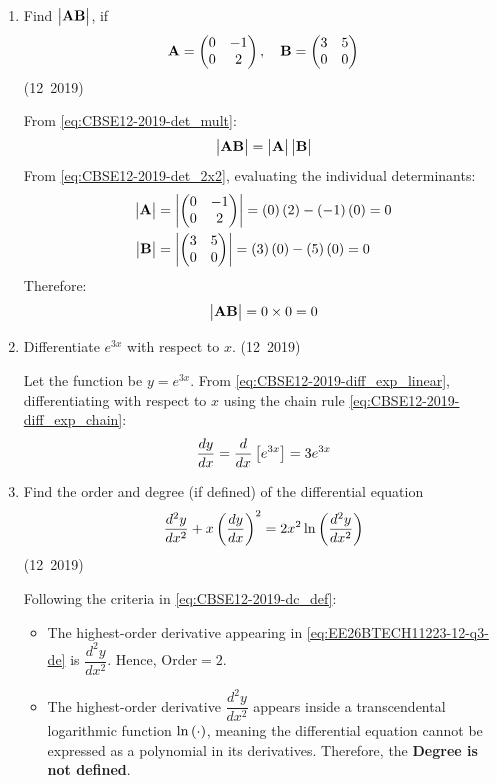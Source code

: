 \begin{enumerate}[label=\thesubsection.\arabic*, ref=\thesubsection.\theenumi]
	
\item Find $\begin{vmatrix}\mathbf{AB}\end{vmatrix}$, if
\begin{align}
	\mathbf{A} = \begin{pmatrix}0 & -1 \\ 0 & 2\end{pmatrix}, \quad \mathbf{B} = \begin{pmatrix}3 & 5 \\ 0 & 0\end{pmatrix}
\end{align}
\hfill (12~2019)

\solution
From \eqref{eq:CBSE12-2019-det_mult}:
\begin{align}
	\begin{vmatrix}\mathbf{AB}\end{vmatrix} = \begin{vmatrix}\mathbf{A}\end{vmatrix} \begin{vmatrix}\mathbf{B}\end{vmatrix}
\end{align}
From \eqref{eq:CBSE12-2019-det_2x2}, evaluating the individual determinants:
\begin{align}
	\begin{vmatrix}\mathbf{A}\end{vmatrix} &= \begin{vmatrix}\begin{pmatrix}0 & -1 \\ 0 & 2\end{pmatrix}\end{vmatrix} = \left(0\right)\left(2\right) - \left(-1\right)\left(0\right) = 0 \\
	\begin{vmatrix}\mathbf{B}\end{vmatrix} &= \begin{vmatrix}\begin{pmatrix}3 & 5 \\ 0 & 0\end{pmatrix}\end{vmatrix} = \left(3\right)\left(0\right) - \left(5\right)\left(0\right) = 0
\end{align}
Therefore:
\begin{align}
	\begin{vmatrix}\mathbf{AB}\end{vmatrix} = 0 \times 0 = 0
\end{align}


\item Differentiate $e^{3x}$ with respect to $x$.
\hfill (12~2019)

\solution
Let the function be $y = e^{3x}$.
From \eqref{eq:CBSE12-2019-diff_exp_linear}, differentiating with respect to $x$ using the chain rule \eqref{eq:CBSE12-2019-diff_exp_chain}:
\begin{align}
	\frac{dy}{dx} = \frac{d}{dx}{}\left[e^{3x}\right] = 3e^{3x}
\end{align}


\item Find the order and degree (if defined) of the differential equation
\begin{align}
	\frac{d^2y}{dx^2} + x\left(\frac{dy}{dx}\right)^2 = 2x^2\ln\left(\frac{d^2y}{dx^2}\right) \label{eq:EE26BTECH11223-12-q3-de}
\end{align}
\hfill (12~2019)

\solution
Following the criteria in \eqref{eq:CBSE12-2019-dc_def}:
\begin{itemize}
	\item The highest-order derivative appearing in \eqref{eq:EE26BTECH11223-12-q3-de} is $\dfrac{d^2y}{dx^2}$. Hence, $\text{Order} = 2$.
	\item The highest-order derivative $\dfrac{d^2y}{dx^2}$ appears inside a transcendental logarithmic function $\ln\left(\cdot\right)$, meaning the differential equation cannot be expressed as a polynomial in its derivatives. Therefore, the \textbf{Degree is not defined}.
\end{itemize}


\end{enumerate}
